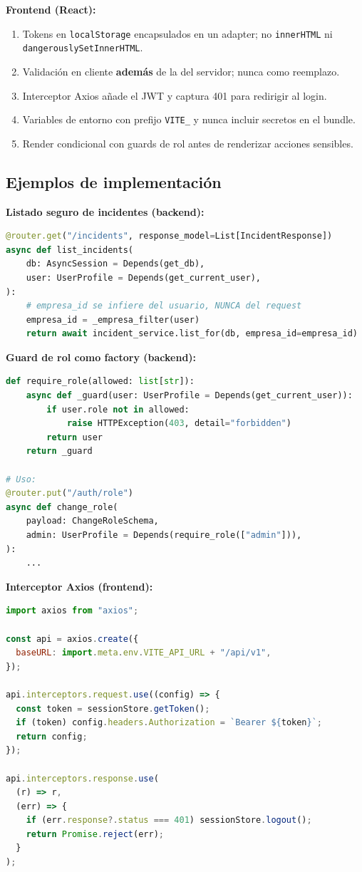 \documentclass[12pt,a4paper,oneside]{article}
\begin{document}
\textbf{Frontend (React):}
\begin{enumerate}[leftmargin=*]
  \item Tokens en \texttt{localStorage} encapsulados en un adapter; no \texttt{innerHTML} ni \texttt{dangerouslySetInnerHTML}.
  \item Validación en cliente \textbf{además} de la del servidor; nunca como reemplazo.
  \item Interceptor Axios añade el JWT y captura 401 para redirigir al login.
  \item Variables de entorno con prefijo \texttt{VITE\_} y nunca incluir secretos en el bundle.
  \item Render condicional con guards de rol antes de renderizar acciones sensibles.
\end{enumerate}

\subsection{Ejemplos de implementación}

\textbf{Listado seguro de incidentes (backend):}

\begin{lstlisting}[language=Python]
@router.get("/incidents", response_model=List[IncidentResponse])
async def list_incidents(
    db: AsyncSession = Depends(get_db),
    user: UserProfile = Depends(get_current_user),
):
    # empresa_id se infiere del usuario, NUNCA del request
    empresa_id = _empresa_filter(user)
    return await incident_service.list_for(db, empresa_id=empresa_id)
\end{lstlisting}

\textbf{Guard de rol como factory (backend):}

\begin{lstlisting}[language=Python]
def require_role(allowed: list[str]):
    async def _guard(user: UserProfile = Depends(get_current_user)):
        if user.role not in allowed:
            raise HTTPException(403, detail="forbidden")
        return user
    return _guard

# Uso:
@router.put("/auth/role")
async def change_role(
    payload: ChangeRoleSchema,
    admin: UserProfile = Depends(require_role(["admin"])),
):
    ...
\end{lstlisting}

\textbf{Interceptor Axios (frontend):}

\begin{lstlisting}[language=JavaScript]
import axios from "axios";

const api = axios.create({
  baseURL: import.meta.env.VITE_API_URL + "/api/v1",
});

api.interceptors.request.use((config) => {
  const token = sessionStore.getToken();
  if (token) config.headers.Authorization = `Bearer ${token}`;
  return config;
});

api.interceptors.response.use(
  (r) => r,
  (err) => {
    if (err.response?.status === 401) sessionStore.logout();
    return Promise.reject(err);
  }
);
\end{lstlisting}
\end{document}
